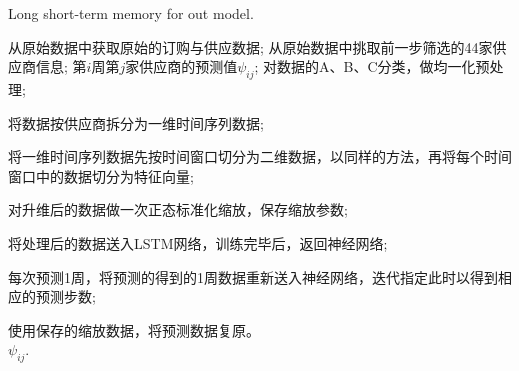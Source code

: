 \begin{algorithm}[htb]
  \caption{ Long short-term memory for out model.}
  \label{alg:lstm}
  \begin{algorithmic}[1]
    \Require
      从原始数据中获取原始的订购与供应数据;
      从原始数据中挑取前一步筛选的44家供应商信息;
    \Ensure
      第$i$周第$j$家供应商的预测值$\psi_{i j}$;
    \State 对数据的A、B、C分类，做均一化预处理;

    \State 将数据按供应商拆分为一维时间序列数据;

    \State 将一维时间序列数据先按时间窗口切分为二维数据，以同样的方法，再将每个时间窗口中的数据切分为特征向量;

    \State 对升维后的数据做一次正态标准化缩放，保存缩放参数;

    \State 将处理后的数据送入LSTM网络，训练完毕后，返回神经网络;

    \State 每次预测1周，将预测的得到的1周数据重新送入神经网络，迭代指定此时以得到相应的预测步数;

    \State 使用保存的缩放数据，将预测数据复原。\\
    \Return $\psi_{i j}$.
  \end{algorithmic}
\end{algorithm}


